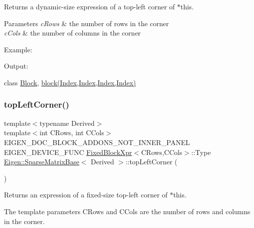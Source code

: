 \begin{DoxyReturn}{Returns}
a dynamic-\/size expression of a top-\/left corner of $\ast$this.
\end{DoxyReturn}

\begin{DoxyParams}{Parameters}
{\em c\+Rows} & the number of rows in the corner \\
\hline
{\em c\+Cols} & the number of columns in the corner\\
\hline
\end{DoxyParams}
Example\+: 
\begin{DoxyCodeInclude}{0}
\end{DoxyCodeInclude}
 Output\+: 
\begin{DoxyVerbInclude}
\end{DoxyVerbInclude}
 class \mbox{\hyperlink{class_eigen_1_1_block}{Block}}, \mbox{\hyperlink{class_eigen_1_1_sparse_matrix_base_a7c28a2f511181c727396d5e813519d38}{block(\+Index,\+Index,\+Index,\+Index)}} \mbox{\label{class_eigen_1_1_sparse_matrix_base_a15819a901d677053cff381a3b7c6739b}} 
\subsubsection{\texorpdfstring{topLeftCorner()}{topLeftCorner()}\hspace{0.1cm}{\footnotesize\ttfamily [2/3]}}
{\footnotesize\ttfamily template$<$typename Derived$>$ \\
template$<$int C\+Rows, int C\+Cols$>$ \\
E\+I\+G\+E\+N\+\_\+\+D\+O\+C\+\_\+\+B\+L\+O\+C\+K\+\_\+\+A\+D\+D\+O\+N\+S\+\_\+\+N\+O\+T\+\_\+\+I\+N\+N\+E\+R\+\_\+\+P\+A\+N\+EL E\+I\+G\+E\+N\+\_\+\+D\+E\+V\+I\+C\+E\+\_\+\+F\+U\+NC \mbox{\hyperlink{struct_eigen_1_1_sparse_matrix_base_1_1_fixed_block_xpr}{Fixed\+Block\+Xpr}}$<$C\+Rows,C\+Cols$>$\+::Type \mbox{\hyperlink{class_eigen_1_1_sparse_matrix_base}{Eigen\+::\+Sparse\+Matrix\+Base}}$<$ Derived $>$\+::top\+Left\+Corner (\begin{DoxyParamCaption}{ }\end{DoxyParamCaption})\hspace{0.3cm}{\ttfamily [inline]}}

\begin{DoxyReturn}{Returns}
an expression of a fixed-\/size top-\/left corner of $\ast$this.
\end{DoxyReturn}
The template parameters C\+Rows and C\+Cols are the number of rows and columns in the corner.

